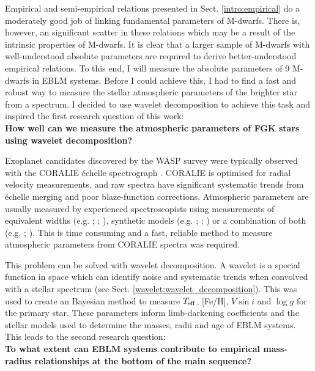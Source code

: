 Empirical and semi-empirical relations presented in Sect. \ref{intro:empirical} do a moderately good job of linking fundamental parameters of M-dwarfs. There is, however, an significant scatter in these relations which may be a result of the intrinsic properties of M-dwarfs. It is clear that a larger sample of M-dwarfs with well-understood absolute parameters are required to derive better-understood empirical relations. To this end, I will measure the absolute parameters of 9 M-dwarfs in EBLM systems. Before I could achieve this, I had to find a fast and robust way to measure the stellar atmospheric parameters of the brighter star from a spectrum. I decided to use wavelet decomposition to achieve this task and inspired the first research question of this work: \\

\textbf{How well can we measure the atmospheric parameters of FGK stars using wavelet decomposition?}

Exoplanet candidates discovered by the WASP survey \citep{2006PASP..118.1407P} were typically observed with the CORALIE \'{e}chelle spectrograph \citep{2001Msngr.105....1Q}. CORALIE is optimised for radial velocity measurements, and raw spectra have significant systematic trends from \'{e}chelle merging and poor blaze-function corrections. Atmospheric parameters are usually measured by experienced spectroscopists using measurements of equivalent widths (e.g. \citealt{2013A&A...556A.150S}; \citealt{2014A&A...562A..10C}; \citealt{2015A&A...577A..67S}), synthetic models (e.g. \citealt{2016ascl.soft05004M}; \citealt{2012ascl.soft05004P}; \citealt{2017A&A...597A..16P}) or a combination of both (e.g. \citealt{2007MNRAS.379..773S}; \citealt{Doyle2015}). This is time consuming and a fast, reliable method to measure atmospheric parameters from CORALIE spectra was required.

This problem can be solved with wavelet decomposition. A wavelet is a special function in space which can identify noise and systematic trends when convolved with a stellar spectrum (see Sect. \ref{wavelet:wavelet_decomposition}). This was used to create an Bayesian method to measure $T_{\rm eff}$, [Fe/H], $V \sin i$ and $\log g$ for the primary star. These parameters inform  limb-darkening coefficients and the stellar models used to determine the masses, radii and age of EBLM systems. This leads to the second research question:\\

\textbf{To what extent can EBLM systems contribute to empirical mass-radius relationships at the bottom of the main sequence? }

